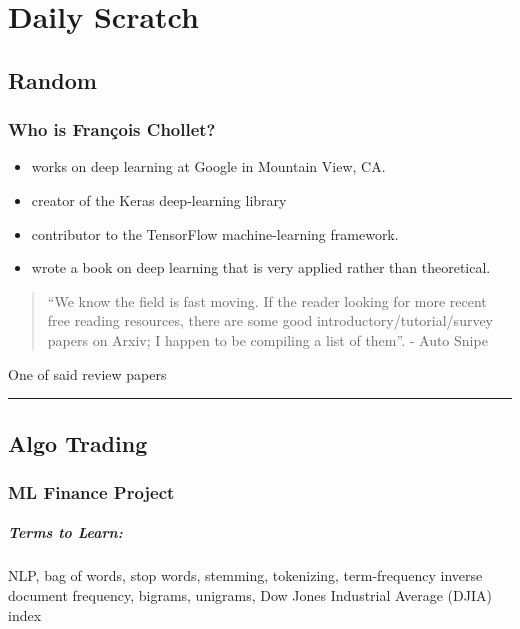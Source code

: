 
\chapter{Daily Scratch}
\section{Random}

\subsection*{Who is François Chollet?}
\begin{itemize}
\item
	works on deep learning at Google in Mountain View, CA.
\item
	creator of the Keras deep-learning library
\item
	contributor to the TensorFlow machine-learning framework.
\item
	wrote a book on deep learning that is very applied rather than theoretical.
\end{itemize}

\begin{quote}
``We know the field is fast moving. If the reader looking for more recent free reading resources, there are some good introductory/tutorial/survey papers on Arxiv; I happen to be compiling a list of them''. - Auto Snipe
\end{quote}

 One of said review papers \cite{raghu2020survey}


\hrule
\section{Algo Trading}

\subsection{ML Finance Project}

\paragraph*{Terms to Learn: } NLP, bag of words, stop words, stemming, tokenizing, term-frequency inverse document frequency, bigrams, unigrams, Dow Jones Industrial Average (DJIA) index


